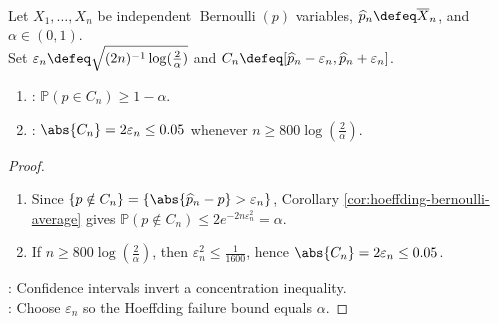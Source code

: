 \begin{corollary} \label{cor:hoeffding-confidence-interval-bernoulli} \\
Let $X_1,\ldots,X_n$ be independent $\operatorname{Bernoulli}(p)$ variables, $\widehat p_n\defeq\overline{X}_n$, and $\alpha\in(0,1)$.\\
Set $\varepsilon_n\defeq\sqrt{(2n)^{-1}\log(\frac{2}{\alpha})}$ and $C_n\defeq[\widehat p_n-\varepsilon_n,\widehat p_n+\varepsilon_n]$.
\begin{enumerate}[label=(\roman*)]
\setlength{\itemsep}{0pt}
\item {}: $\mathbb{P}(p\in C_n)\geq1-\alpha$.
\item {}: $\abs{C_n}=2\varepsilon_n\leq0.05$ whenever $n\geq800\log(\frac{2}{\alpha})$.
\end{enumerate}
\begin{proof}
\begin{enumerate}[label=(\roman*)]
\setlength{\itemsep}{0pt}
\item Since $\{p\notin C_n\}=\{\abs{\widehat p_n-p}>\varepsilon_n\}$, Corollary \ref{cor:hoeffding-bernoulli-average} gives $\mathbb{P}(p\notin C_n)\leq2e^{-2n\varepsilon_n^2}=\alpha$.
\item If $n\geq800\log(\frac{2}{\alpha})$, then $\varepsilon_n^2\leq\frac{1}{1600}$, hence $\abs{C_n}=2\varepsilon_n\leq0.05$.
\end{enumerate}
: Confidence intervals invert a concentration inequality.\\
: Choose $\varepsilon_n$ so the Hoeffding failure bound equals $\alpha$.
\end{proof}
\end{corollary}

